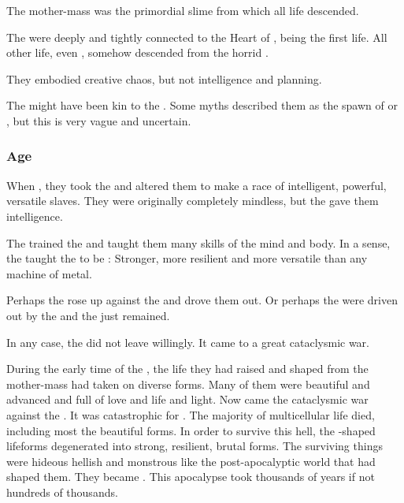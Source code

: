 The mother-mass was the primordial slime from which all \Miithian{} life descended. 

The \noggyaleth were deeply and tightly connected to the Heart of \Miith, being the first life.
All other life, even \ophidians, somehow descended from the horrid \noggyaleth.

They embodied creative chaos, but not intelligence and planning.

The \noggyaleth might have been kin to the \xss.
Some \draconic myths described them as the spawn of \RuinSatha or \KyaethemChreiAz, but this is very vague and uncertain.





\subsubsection{\Voyager Age}
When , they took the \noggyaleth and altered them to make a race of intelligent, powerful, versatile slaves.
They were originally completely mindless, but the \voyagers gave them intelligence.

The \voyagers trained the \noggyaleth and taught them many skills of the mind and body. 
In a sense, the \voyagers taught the \noggyaleth to be :
Stronger, more resilient and more versatile than any machine of metal. 

Perhaps the \noggyaleth rose up against the \voyagers and drove them out.
Or perhaps the \voyagers were driven out by the \xss and the \noggyaleth just remained.

In any case, the \voyagers did not leave willingly. 
It came to a great cataclysmic war. 

During the early time of the \voyagers, the life they had raised and shaped from the mother-mass had taken on diverse forms. 
Many of them were beautiful and advanced and full of love and life and light. 
Now came the cataclysmic war against the \voyagers. 
It was catastrophic for \Miith. 
The majority of multicellular life died, including most the beautiful forms. 
In order to survive this hell, the \voyager-shaped lifeforms degenerated into strong, resilient, brutal forms.
The surviving things were hideous hellish and monstrous like the post-apocalyptic world that had shaped them.
They became \noggyaleth. 
This apocalypse took thousands of years if not hundreds of thousands. 





